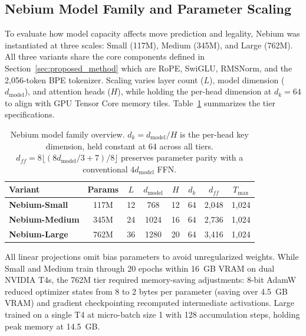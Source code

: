 
\subsection{Nebium Model Family and Parameter Scaling}
\label{sec:model_family}

To evaluate how model capacity affects move prediction and legality, Nebium was instantiated at three scales: Small (117M), Medium (345M), and Large (762M). All three variants share the core components defined in Section~\ref{sec:proposed_method} which are RoPE, SwiGLU, RMSNorm, and the 2,056-token BPE tokenizer. Scaling varies layer count ($L$), model dimension ($d_{\text{model}}$), and attention heads ($H$), while holding the per-head dimension at $d_k = 64$ to align with GPU Tensor Core memory tiles. Table~\ref{tab:family_overview} summarizes the tier specifications.

\begin{table}[H]
\centering
\small
\caption[Nebium Model Family Architecture Overview]{Nebium model family overview. $d_k = d_{\text{model}} / H$ is the per-head key dimension, held constant at 64 across all tiers. $d_{ff} = 8\lfloor(8d_{\text{model}}/3 + 7)/8\rfloor$ preserves parameter parity with a conventional $4d_{\text{model}}$ FFN.}
\label{tab:family_overview}
\begin{tabularx}{\linewidth}{>{\bfseries}l c c c c c c c}
\toprule
\textbf{Variant} & \textbf{Params} & \textbf{$L$} & \textbf{$d_{\text{model}}$} & \textbf{$H$} & \textbf{$d_k$} & \textbf{$d_{ff}$} & \textbf{$T_{\text{max}}$} \\
\midrule
Nebium-Small  & 117M  & 12 & 768  & 12 & 64 & 2,048 & 1,024 \\
Nebium-Medium & 345M  & 24 & 1024 & 16 & 64 & 2,736 & 1,024 \\
Nebium-Large  & 762M  & 36 & 1280 & 20 & 64 & 3,416 & 1,024 \\
\bottomrule
\end{tabularx}
\end{table}

All linear projections omit bias parameters to avoid unregularized weights. While Small and Medium train through 20 epochs within 16~GB VRAM on dual NVIDIA T4s, the 762M tier required memory-saving adjustments: 8-bit AdamW reduced optimizer states from 8 to 2 bytes per parameter (saving over 4.5~GB VRAM) and gradient checkpointing recomputed intermediate activations. Large trained on a single T4 at micro-batch size 1 with 128 accumulation steps, holding peak memory at 14.5~GB.

